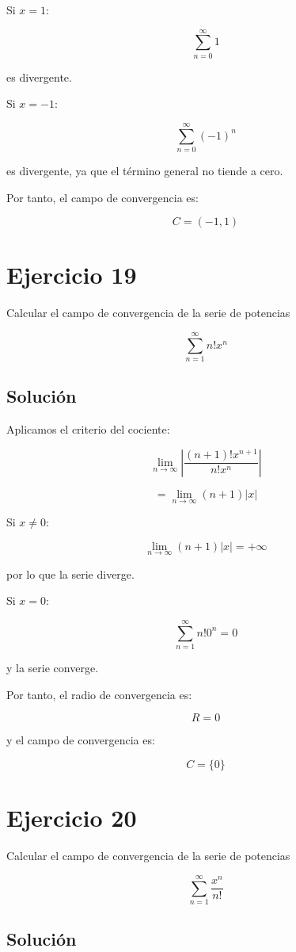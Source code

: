\documentclass[fleqn]{article}
\begin{document}
	Si $x=1$:

	\[
	\sum_{n=0}^{\infty}1
	\]

	es divergente.

	Si $x=-1$:

	\[
	\sum_{n=0}^{\infty}(-1)^n
	\]

	es divergente, ya que el término general no tiende a cero.

	Por tanto, el campo de convergencia es:

	\[
	\boxed{
	C=(-1,1)
	}
	\]

\section{Ejercicio 19}
	Calcular el campo de convergencia de la serie de potencias

	\[
	\sum_{n=1}^{\infty}n!x^n
	\]

	\subsection{Solución}

	Aplicamos el criterio del cociente:

	\[
	\lim_{n\to\infty}
	\left|
	\frac{(n+1)!x^{n+1}}{n!x^n}
	\right|
	\]

	\[
	=
	\lim_{n\to\infty}
	(n+1)|x|
	\]

	Si $x\neq0$:

	\[
	\lim_{n\to\infty}
	(n+1)|x|
	=
	+\infty
	\]

	por lo que la serie diverge.

	Si $x=0$:

	\[
	\sum_{n=1}^{\infty}n!0^n=0
	\]

	y la serie converge.

	Por tanto, el radio de convergencia es:

	\[
	\boxed{
	R=0
	}
	\]

	y el campo de convergencia es:

	\[
	\boxed{
	C=\{0\}
	}
	\]

\section{Ejercicio 20}
	Calcular el campo de convergencia de la serie de potencias

	\[
	\sum_{n=1}^{\infty}\frac{x^n}{n!}
	\]

	\subsection{Solución}
\end{document}
